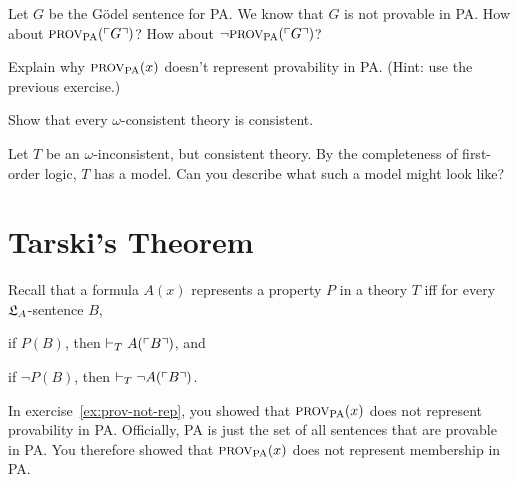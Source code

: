 
\begin{exercise}
  Let $G$ be the Gödel sentence for PA.
  We know that $G$ is not provable in PA.
  How about $\smallcaps{Prov}_{\mathrm{PA}}(\gn{G})$?
  How about $\neg \smallcaps{Prov}_{\mathrm{PA}}(\gn{G})$?
\end{exercise}

\begin{exercise}\label{ex:prov-not-rep}
  Explain why $\smallcaps{Prov}_{\mathrm{PA}}(x)$ doesn't represent provability in PA.
  (Hint: use the previous exercise.)
\end{exercise}

\begin{exercise}
  Show that every $\omega$-consistent theory is consistent.
\end{exercise}

\begin{exercise}
  Let $T$ be an $\omega$-inconsistent, but consistent theory.
  By the completeness of first-order logic,
  $T$ has a model.
  Can you describe what such a model might look like?
\end{exercise}

\section{Tarski's Theorem}

Recall that a formula $A(x)$ represents a property $P$ in a theory $T$ iff
for every $\mathfrak{L}_A$-sentence $B$,
\begin{cenumerate}
    \item[(i)] if $P(B)$, then $\vdash_T A(\ulcorner B \urcorner)$, and
    \item[(ii)] if $\neg P(B)$, then $\vdash_T \neg A(\ulcorner B \urcorner)$.
\end{cenumerate}
In exercise~\ref{ex:prov-not-rep},
you showed that $\smallcaps{Prov}_{\mathrm{PA}}(x)$ does not represent provability in PA.
Officially,
PA is just the set of all sentences that are provable in PA.
You therefore showed that $\smallcaps{Prov}_{\mathrm{PA}}(x)$ does not represent membership in PA.

